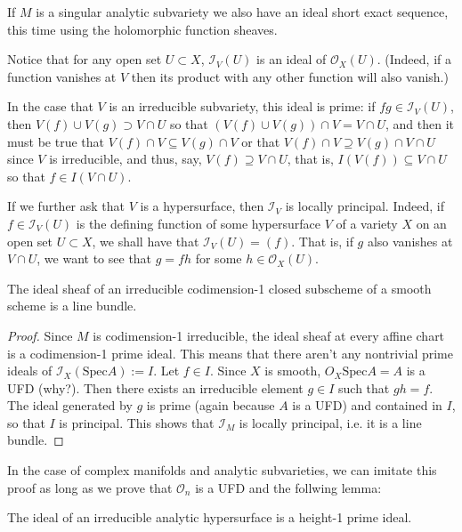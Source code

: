If $M$ is a singular analytic subvariety we also have an ideal short exact
sequence, this time using the holomorphic function sheaves.

\medskip\noindent
Notice that for any open set $U\subset X$,
$\mathcal{I}_V(U)$ is an ideal of $\mathcal{O}_X(U)$. (Indeed,
if a function vanishes at $V$ then its product
with any other function will also vanish.)

In the case that $V$ is an irreducible subvariety,
this ideal is prime: if $fg \in \mathcal{I}_V(U)$,
then $V(f) \cup  V(g) \supset V\cap U$ 
so that $(V(f) \cup  V(g))\cap V = V\cap U$,
and then it must be true that $V(f)\cap V\subseteq V(g)\cap V$
or that $V(f)\cap V \supseteq V(g)\cap V \cap U$
since $V$ is irreducible, and thus, say,
$V(f)\supseteq V \cap U$,
that is, $I(V(f))\subseteq V \cap U$
so that $f \in I(V \cap U)$.

If we further ask that $V$ is a hypersurface,
then $\mathcal{I}_V$ is locally principal.
Indeed, if $f \in \mathcal{I}_V(U)$ is the 
defining function of some hypersurface
$V$ of a variety $X$ on an open set $U \subset X$,
we shall have that $\mathcal{I}_V(U)=(f)$. 
That is, if $g$ also vanishes at $V\cap U$,
we want to see that $g = fh$ for some $h \in \mathcal{O}_X(U)$.

\begin{lemma}
\label{lemma-ideal-sheaf-is-line-bundle-schemes}
The ideal sheaf of an irreducible codimension-1 closed subscheme of a smooth
scheme is a line bundle.
\end{lemma}

\begin{proof}
Since $M$ is codimension-1 irreducible, the ideal sheaf at every affine chart is
a codimension-1 prime ideal. This means that there aren't any nontrivial prime
ideals of $\mathcal{I}_X(\text{Spec}A):=I$. Let $f\in I$.
Since $X$ is smooth, $O_X\text{Spec}A=A$ is a UFD (why?). Then there exists an
irreducible element $g\in I$ such that $gh=f$. The ideal generated by $g$ is
prime (again because $A$ is a UFD) 
and contained in $I$, so that $I$ is principal. This shows that
$\mathcal{I}_M$ is locally principal, i.e. it is a line bundle.
\end{proof}

In the case of complex manifolds and analytic subvarieties, we can imitate
this proof as long as we prove that $\mathcal{O}_n$ is a UFD and the follwing
lemma:

\begin{lemma}
\label{lemma-ideal-of-irreducible-hypersurface-is-height-1-prime}
The ideal of an irreducible analytic hypersurface is a height-1 prime ideal.
\end{lemma}

